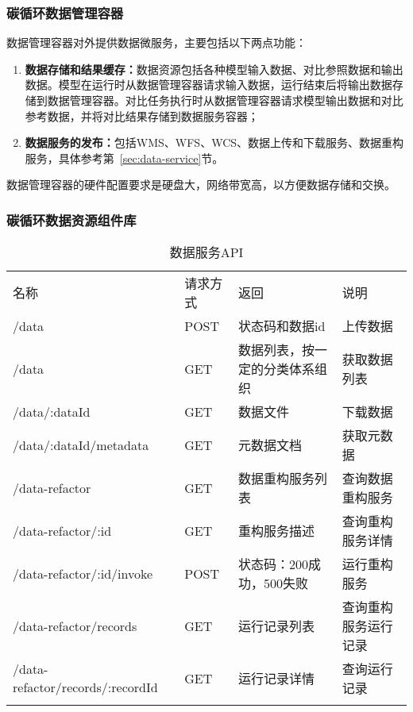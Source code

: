 \subsubsection{碳循环数据管理容器}
数据管理容器对外提供数据微服务，主要包括以下两点功能：
\begin{enumerate}[(1)]
\item \textbf{数据存储和结果缓存：}数据资源包括各种模型输入数据、对比参照数据和输出数据。模型在运行时从数据管理容器请求输入数据，运行结束后将输出数据存储到数据管理容器。对比任务执行时从数据管理容器请求模型输出数据和对比参考数据，并将对比结果存储到数据服务容器；
\item \textbf{数据服务的发布：}包括WMS、WFS、WCS、数据上传和下载服务、数据重构服务，具体参考第~\ref{sec:data-service}节。
\end{enumerate}

数据管理容器的硬件配置要求是硬盘大，网络带宽高，以方便数据存储和交换。

\subsubsection{碳循环数据资源组件库}

\noindent\begin{table}[!htbp]
    \centering
    \caption{数据服务API}
    \label{tab:data-service-API}
    \begin{tabular}{llll}
        \Xhline{1.5pt}
        名称 & 请求方式 & 返回 & 说明 \\
        \Xhline{1.5pt}
        /data & POST & 状态码和数据id & 上传数据 \\
        /data & GET & \multicolumn{1}{m{0.24\columnwidth}}{数据列表，按一定的分类体系组织} & 获取数据列表 \\
        /data/:dataId & GET & 数据文件 & 下载数据 \\
        /data/:dataId/metadata & GET & 元数据文档 & 获取元数据 \\
        /data-refactor & GET & 数据重构服务列表 & \multicolumn{1}{m{0.18\columnwidth}}{查询数据重构服务} \\
        /data-refactor/:id & GET & 重构服务描述 & \multicolumn{1}{m{0.18\columnwidth}}{查询重构服务详情} \\
        /data-refactor/:id/invoke & POST & \multicolumn{1}{m{0.24\columnwidth}}{状态码：200成功，500失败} & 运行重构服务 \\
        /data-refactor/records & GET & 运行记录列表 & \multicolumn{1}{m{0.18\columnwidth}}{查询重构服务运行记录} \\
        /data-refactor/records/:recordId & GET & 运行记录详情 & 查询运行记录 \\
        \Xhline{1.5pt}
    \end{tabular}
\end{table}

